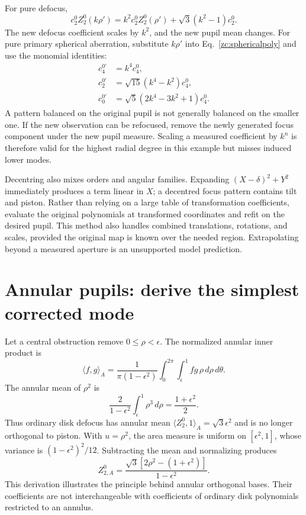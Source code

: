 For pure defocus,
\begin{equation}
 c_2^0Z_2^0(k\rho')
 =k^2c_2^0Z_2^0(\rho')
       +\sqrt3(k^2-1)c_2^0.
\end{equation}
The new defocus coefficient scales by $k^2$, and the new pupil mean
changes. For pure primary spherical aberration, substitute $k\rho'$
into Eq.~\eqref{zc:sphericalpoly} and use the monomial identities:
\begin{align}
 c_4^{0\prime}&=k^4c_4^0,\\
 c_2^{0\prime}&=\sqrt{15}(k^4-k^2)c_4^0,\\
 c_0^{0\prime}&=\sqrt5(2k^4-3k^2+1)c_4^0.
 \label{zc:aperturescaling}
\end{align}
A pattern balanced on the original pupil is not generally balanced
on the smaller one. If the new observation can be refocused, remove
the newly generated focus component under the new pupil measure.
Scaling a measured coefficient by $k^n$ is therefore valid for the
highest radial degree in this example but misses induced lower modes.

Decentring also mixes orders and angular families. Expanding
$(X-\delta)^2+Y^2$ immediately produces a term linear in $X$; a
decentred focus pattern contains tilt and piston. Rather than relying
on a large table of transformation coefficients, evaluate the original
polynomials at transformed coordinates and refit on the desired pupil.
This method also handles combined translations, rotations, and scales,
provided the original map is known over the needed region. Extrapolating
beyond a measured aperture is an unsupported model prediction.

\section{Annular pupils: derive the simplest corrected mode}
Let a central obstruction remove $0\leq\rho<\epsilon$. The normalized
annular inner product is
\begin{equation}
 \langle f,g\rangle_A=
 \frac1{\pi(1-\epsilon^2)}\int_0^{2\pi}\int_\epsilon^1
                         fg\,\rho\,d\rho\,d\theta.
\end{equation}
The annular mean of $\rho^2$ is
\begin{equation}
 \frac{2}{1-\epsilon^2}\int_\epsilon^1\rho^3\,d\rho
          =\frac{1+\epsilon^2}{2}.
\end{equation}
Thus ordinary disk defocus has annular mean
$\langle Z_2^0,1\rangle_A=\sqrt3\epsilon^2$ and is no longer
orthogonal to piston. With $u=\rho^2$, the area measure is uniform
on $[\epsilon^2,1]$, whose variance is
$(1-\epsilon^2)^2/12$. Subtracting the mean and normalizing produces
\begin{equation}
 \boxed{Z_{2,A}^0=
 \frac{\sqrt3[2\rho^2-(1+\epsilon^2)]}{1-\epsilon^2}.}
 \label{zc:annulardefocus}
\end{equation}
This derivation illustrates the principle behind annular orthogonal
bases. Their coefficients are not interchangeable with coefficients
of ordinary disk polynomials restricted to an annulus.

